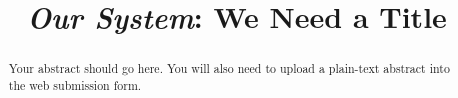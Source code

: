 \documentclass[sigconf, anonymous]{acmart}
\newcommand{\ours}{{\em Our System}\xspace}
\begin{document}
\title{\ours: We Need a Title\xspace}
\begin{abstract}
Your abstract should go here. You will also need to upload a plain-text abstract into the web submission form.
\end{abstract}

\maketitle




\end{document}
